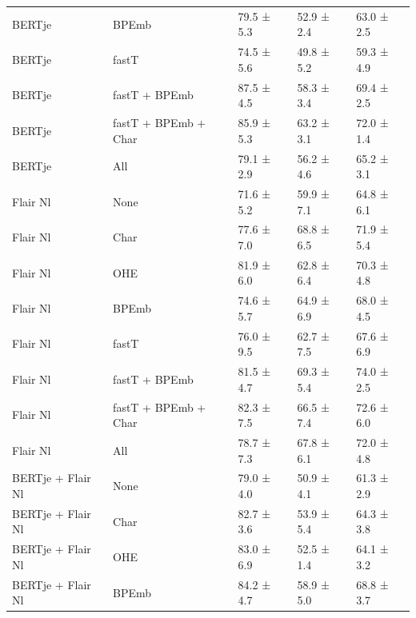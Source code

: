 \documentclass[12pt,a4paper,]{book}
\begin{document}
\begin{longtable}[t]{lllll}
\hspace{1em}BERTje & BPEmb & 79.5 ±  5.3 & 52.9 ±  2.4 & 63.0 ±  2.5\\
\hspace{1em}BERTje & fastT & 74.5 ±  5.6 & 49.8 ±  5.2 & 59.3 ±  4.9\\
\hspace{1em}BERTje & fastT + BPEmb & 87.5 ±  4.5 & 58.3 ±  3.4 & 69.4 ±  2.5\\
\hspace{1em}BERTje & fastT + BPEmb + Char & 85.9 ±  5.3 & 63.2 ±  3.1 & 72.0 ±  1.4\\
\hspace{1em}BERTje & All & 79.1 ±  2.9 & 56.2 ±  4.6 & 65.2 ±  3.1\\
\hspace{1em}Flair Nl & None & 71.6 ±  5.2 & 59.9 ±  7.1 & 64.8 ±  6.1\\
\hspace{1em}Flair Nl & Char & 77.6 ±  7.0 & 68.8 ±  6.5 & 71.9 ±  5.4\\
\hspace{1em}Flair Nl & OHE & 81.9 ±  6.0 & 62.8 ±  6.4 & 70.3 ±  4.8\\
\hspace{1em}Flair Nl & BPEmb & 74.6 ±  5.7 & 64.9 ±  6.9 & 68.0 ±  4.5\\
\hspace{1em}Flair Nl & fastT & 76.0 ±  9.5 & 62.7 ±  7.5 & 67.6 ±  6.9\\
\hspace{1em}Flair Nl & fastT + BPEmb & 81.5 ±  4.7 & 69.3 ±  5.4 & 74.0 ±  2.5\\
\hspace{1em}Flair Nl & fastT + BPEmb + Char & 82.3 ±  7.5 & 66.5 ±  7.4 & 72.6 ±  6.0\\
\hspace{1em}Flair Nl & All & 78.7 ±  7.3 & 67.8 ±  6.1 & 72.0 ±  4.8\\
\hspace{1em}BERTje + Flair Nl & None & 79.0 ±  4.0 & 50.9 ±  4.1 & 61.3 ±  2.9\\
\hspace{1em}BERTje + Flair Nl & Char & 82.7 ±  3.6 & 53.9 ±  5.4 & 64.3 ±  3.8\\
\hspace{1em}BERTje + Flair Nl & OHE & 83.0 ±  6.9 & 52.5 ±  1.4 & 64.1 ±  3.2\\
\hspace{1em}BERTje + Flair Nl & BPEmb & 84.2 ±  4.7 & 58.9 ±  5.0 & 68.8 ±  3.7\\

\end{longtable}
\end{document}
